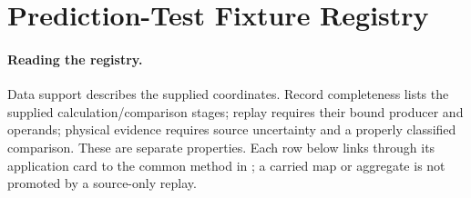 \section{Prediction-Test Fixture Registry}\label{manual:prediction-test-registry}

\paragraph{Reading the registry.}
Data support describes the supplied coordinates. Record completeness lists
the supplied calculation/comparison stages; replay requires their bound
producer and operands; physical evidence requires source uncertainty and a
properly classified comparison. These are separate properties. Each row
below links through its application card to the common method in
; a carried map or aggregate is not promoted
by a source-only replay.





